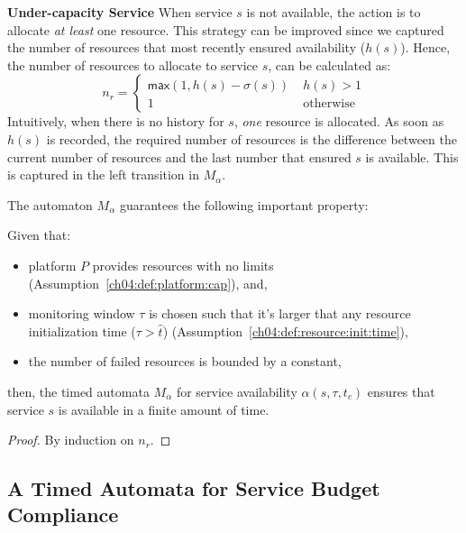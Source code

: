 \textbf{Under-capacity Service}
  When service $s$ is not available, the action is to allocate \emph{at least} one resource.
  This strategy can be improved since we captured the number of resources that
  most recently ensured availability ($h(s)$). Hence, the number of resources to allocate to service $s$, can be calculated as:
  \[
  n_r = 
  \begin{cases}
    \mathsf{max}(1, h(s)-\sigma(s)) &\; h(s) > 1 \\
    1 &\; \text{otherwise}
  \end{cases}
  \]
  Intuitively, when there is no history for $s$, \emph{one} resource is allocated.
  As soon as $h(s)$ is recorded, the required number of resources is the difference between the current number of resources and the last number that ensured $s$ is available.
  This is captured in the left transition in $M_\alpha$.

The automaton $M_\alpha$ guarantees the following important property:
% 

\begin{defn}
\label{ch04:thm:service:avail:conv}
Given that: 
\begin{itemize}
  \item platform $P$ provides resources with no limits (Assumption~\ref{ch04:def:platform:cap}), and,
  \item monitoring window $\tau$ is chosen such that it's larger that any resource initialization time ($\tau > \hat{t}$) (Assumption~\ref{ch04:def:resource:init:time}), 
  \item the number of failed resources
  is bounded by a constant, 
\end{itemize}
then, the timed automata $M_\alpha$ for service availability $\alpha(s,\tau,t_c)$ ensures that service $s$ is available in a finite amount of time.
\end{defn}

\begin{proof}%
By induction on $n_r$.
\end{proof} %

\subsection{A Timed Automata for Service Budget Compliance}
\label{ch04:sec:automata:budget}

